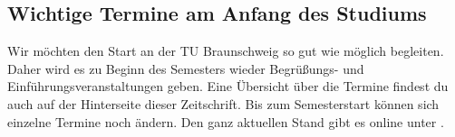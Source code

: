 
\subsection{Wichtige Termine am Anfang des Studiums}


Wir möchten den Start an der TU Braunschweig so gut wie möglich begleiten. Daher wird es zu Beginn des Semesters wieder Begrüßungs- und Einführungsveranstaltungen geben. Eine Übersicht über die Termine findest du auch auf der Hinterseite dieser Zeitschrift. Bis zum Semesterstart können sich einzelne Termine noch ändern. Den ganz aktuellen Stand gibt es online unter .

\renewcommand{\labelitemi}{$\bullet$}
\renewcommand{\labelitemii}{$\bullet$}
\renewcommand{\labelitemiii}{$\bullet$}
\renewcommand{\labelitemiv}{$\bullet$}

